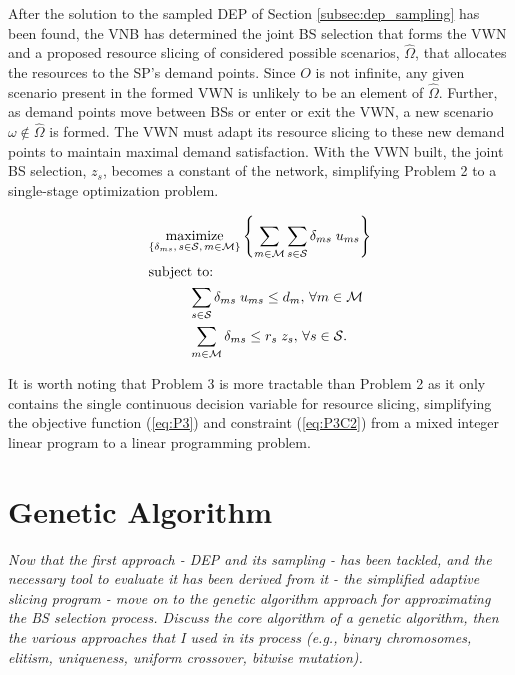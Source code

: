 \documentclass[12pt,dvipsnames]{report}
\begin{document}
After the solution to the sampled DEP of Section \ref{subsec:dep_sampling} has been found, the VNB has determined the joint BS selection that forms the VWN and a proposed resource slicing of considered possible scenarios, $\hat{\Omega}$, that allocates the resources to the SP's demand points.  Since $O$ is not infinite, any given scenario present in the formed VWN is unlikely to be an element of $\hat{\Omega}$.  Further, as demand points move between BSs or enter or exit the VWN, a new scenario $\omega \notin \hat{\Omega}$ is formed.  The VWN must adapt its resource slicing to these new demand points to maintain maximal demand satisfaction.  With the VWN built, the joint BS selection, $z_s$, becomes a constant of the network, simplifying Problem 2 to a single-stage optimization problem.

\vspace{3mm}
\begin{tcolorbox}[title = Problem 3 (Deterministic Adaptive Slicing)]
\begin{align}
& \underset{\left\{ \substack{
	\delta_{ms},\,	s \in \mathcal{S},\, m \in \mathcal{M}} \right\}} {\text{maximize}}
\left\{ \sum_{m \in \mathcal{M}} \sum_{s \in \mathcal{S}} \delta_{ms} \; u_{ms} \right\} \label{eq:P3}\\
& \text{subject to:}  \nonumber \\
& \hspace{0.4in} \sum_{s \in \mathcal{S}} \delta_{ms} \; u_{ms} \leq d_m,\, \forall m \in \mathcal{M} \label{eq:P3C1}\\
& \hspace{0.4in} \sum_{m \in \mathcal{M}} \delta_{ms} \leq r_s \; z_s,\, \forall s \in \mathcal{S}. \label{eq:P3C2}
\end{align}
\end{tcolorbox}

It is worth noting that Problem 3 is more tractable than Problem 2 as it only contains the single continuous decision variable for resource slicing, simplifying the objective function (\ref{eq:P3}) and constraint (\ref{eq:P3C2}) from a mixed integer linear program to a linear programming problem.

\section{Genetic Algorithm} \label{sec:ga}

\textit{Now that the first approach - DEP and its sampling - has been tackled, and the necessary tool to evaluate it has been derived from it - the simplified adaptive slicing program - move on to the genetic algorithm approach for approximating the BS selection process.  Discuss the core algorithm of a genetic algorithm, then the various approaches that I used in its process (e.g., binary chromosomes, elitism, uniqueness, uniform crossover, bitwise mutation).}
\end{document}
